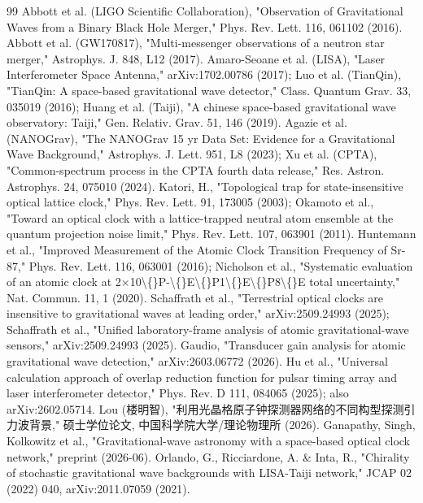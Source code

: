 \documentclass[12pt,a4paper]{article}
\begin{document}
\begin{thebibliography}{99}
 Abbott et al. (LIGO Scientific Collaboration), "Observation of Gravitational Waves from a Binary Black Hole Merger," Phys. Rev. Lett. 116, 061102 (2016).
 Abbott et al. (GW170817), "Multi-messenger observations of a neutron star merger," Astrophys. J. 848, L12 (2017).
 Amaro-Seoane et al. (LISA), "Laser Interferometer Space Antenna," arXiv:1702.00786 (2017); Luo et al. (TianQin), "TianQin: A space-based gravitational wave detector," Class. Quantum Grav. 33, 035019 (2016); Huang et al. (Taiji), "A chinese space-based gravitational wave observatory: Taiji," Gen. Relativ. Grav. 51, 146 (2019).
 Agazie et al. (NANOGrav), "The NANOGrav 15 yr Data Set: Evidence for a Gravitational Wave Background," Astrophys. J. Lett. 951, L8 (2023); Xu et al. (CPTA), "Common-spectrum process in the CPTA fourth data release," Res. Astron. Astrophys. 24, 075010 (2024).
 Katori, H., "Topological trap for state-insensitive optical lattice clock," Phys. Rev. Lett. 91, 173005 (2003); Okamoto et al., "Toward an optical clock with a lattice-trapped neutral atom ensemble at the quantum projection noise limit," Phys. Rev. Lett. 107, 063901 (2011).
 Huntemann et al., "Improved Measurement of the Atomic Clock Transition Frequency of Sr-87," Phys. Rev. Lett. 116, 063001 (2016); Nicholson et al., "Systematic evaluation of an atomic clock at 2×10\textbackslash\{\}P-\textbackslash\{\}E\textbackslash\{\}P1\textbackslash\{\}E\textbackslash\{\}P8\textbackslash\{\}E total uncertainty," Nat. Commun. 11, 1 (2020).
 Schaffrath et al., "Terrestrial optical clocks are insensitive to gravitational waves at leading order," arXiv:2509.24993 (2025); Schaffrath et al., "Unified laboratory-frame analysis of atomic gravitational-wave sensors," arXiv:2509.24993 (2025).
 Gaudio, "Transducer gain analysis for atomic gravitational wave detection," arXiv:2603.06772 (2026).
 Hu et al., "Universal calculation approach of overlap reduction function for pulsar timing array and laser interferometer detector," Phys. Rev. D 111, 084065 (2025); also arXiv:2602.05714.
 Lou (楼明智), "利用光晶格原子钟探测器网络的不同构型探测引力波背景," 硕士学位论文, 中国科学院大学/理论物理所 (2026).
 Ganapathy, Singh, Kolkowitz et al., "Gravitational-wave astronomy with a space-based optical clock network," preprint (2026-06).
 Orlando, G., Ricciardone, A. \& Inta, R., "Chirality of stochastic gravitational wave backgrounds with LISA-Taiji network," JCAP 02 (2022) 040, arXiv:2011.07059 (2021).

\end{thebibliography}
\end{document}
